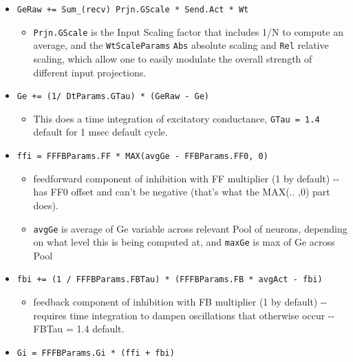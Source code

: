 \documentclass[11pt,twoside]{article}
\newif\myifpdf
\providecommand{\tightlist}{%
  \setlength{\itemsep}{.25in}\setlength{\parskip}{-.25in}}
\begin{document}
\begin{itemize}
  \item \texttt{GeRaw\ +=\ Sum\_(recv)\ Prjn.GScale\ *\ Send.Act\ *\ Wt}
    \begin{itemize}
	\tightlist
    \item
      \texttt{Prjn.GScale} is the Input Scaling factor that
      includes 1/N to compute an average, and the \texttt{WtScaleParams}
      \texttt{Abs} absolute scaling and \texttt{Rel} relative scaling,
      which allow one to easily modulate the overall strength of
      different input projections.
    \end{itemize}
	
  \item \texttt{Ge\ +=\ (1/\ DtParams.GTau)\ *\ (GeRaw\ -\ Ge)}
    \begin{itemize}
	\tightlist
    \item
      This does a time integration of excitatory conductance,
      \texttt{GTau\ =\ 1.4} default for 1 msec default cycle.
    \end{itemize}
	
  \item \texttt{ffi\ =\ FFFBParams.FF\ *\ MAX(avgGe\ -\ FFBParams.FF0,\ 0)}

    \begin{itemize}
	\tightlist
    \item
      feedforward component of inhibition with FF multiplier (1 by
      default) -\/- has FF0 offset and can't be negative (that's what
      the MAX(.. ,0) part does).
    \item
      \texttt{avgGe} is average of Ge variable across relevant Pool of
      neurons, depending on what level this is being computed at, and
      \texttt{maxGe} is max of Ge across Pool
    \end{itemize}

  \item \texttt{fbi\ +=\ (1\ /\ FFFBParams.FBTau)\ *\ (FFFBParams.FB\ *\ avgAct\ -\ fbi)}

    \begin{itemize}
	\tightlist
    \item
      feedback component of inhibition with FB multiplier (1 by default)
      -\/- requires time integration to dampen oscillations that
      otherwise occur -\/- FBTau = 1.4 default.
    \end{itemize}
	
  \item \texttt{Gi\ =\ FFFBParams.Gi\ *\ (ffi\ +\ fbi)}


\end{itemize}
\end{document}
